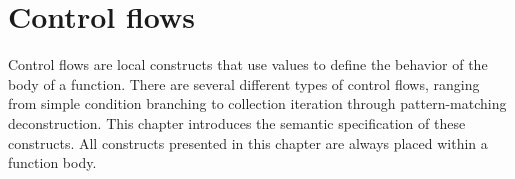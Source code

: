 \chapter{Control flows}%
\pagecolor{gray!10!white}

\label{chap:chap7}
\label{chap:control_flows}

Control flows are local constructs that use values to define the behavior of the
body of a function. There are several different types of control flows, ranging
from simple condition branching to collection iteration through pattern-matching
deconstruction. This chapter introduces the semantic specification of these
constructs. All constructs presented in this chapter are always placed within a
function body.

\minitoc%











